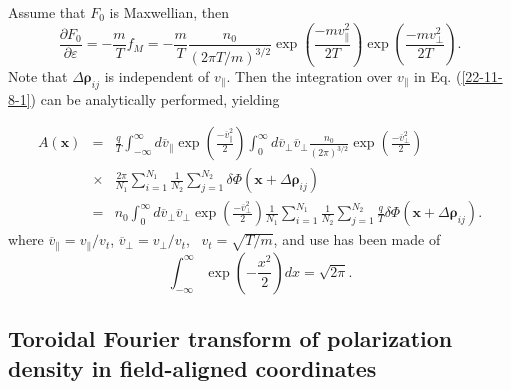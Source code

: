 \documentclass{article}
\begin{document}
Assume that $F_0$ is Maxwellian, then
\begin{equation}
  \frac{\partial F_0}{\partial \varepsilon} = - \frac{m}{T} f_M = -
  \frac{m}{T} \frac{n_0}{(2 \pi T / m)^{3 / 2}} \exp \left( \frac{- m
  v^2_{\parallel}}{2 T} \right) \exp \left( \frac{- m v^2_{\perp}}{2 T}
  \right) .
\end{equation}
Note that $\Delta \mathbf{\rho}_{i j}$ is independent of $v_{\parallel}$. Then
the integration over $v_{\parallel}$ in Eq. (\ref{22-11-8-1}) can be
analytically performed, yielding


\begin{eqnarray}
  A (\mathbf{x}) & = & \frac{q}{T}  \int_{- \infty}^{\infty} d
  \overline{v}_{\parallel} \exp \left( \frac{- \overline{v}^2_{\parallel}}{2}
  \right) \int_0^{\infty} d \overline{v}_{\perp} \overline{v}_{\perp}
  \frac{n_0}{(2 \pi)^{3 / 2}} \exp \left( \frac{- \overline{v}^2_{\perp}}{2}
  \right) \nonumber\\
  & \times & \frac{2 \pi}{N_1} \sum_{i = 1}^{N_1} \frac{1}{N_2}  \sum_{j =
  1}^{N_2} \delta \Phi (\mathbf{x} + \Delta \mathbf{\rho}_{i j}) \nonumber\\
  & = & n_0  \int_0^{\infty} d \overline{v}_{\perp} \overline{v}_{\perp} \exp
  \left( \frac{- \overline{v}^2_{\perp}}{2} \right) \frac{1}{N_1} \sum_{i =
  1}^{N_1} \frac{1}{N_2}  \sum_{j = 1}^{N_2} \frac{q}{T} \delta \Phi
  (\mathbf{x} + \Delta \mathbf{\rho}_{i j}) .  \label{21-9-16-a5}
\end{eqnarray}
where $\overline{v}_{\parallel} = v_{\parallel} / v_t$, $\overline{v}_{\perp}
= v_{\perp} / v_t$, \ $v_t = \sqrt{T / m}$, and use has been made of
\begin{equation}
  \int_{- \infty}^{\infty} \exp \left( - \frac{x^2}{2} \right) d x = \sqrt{2
  \pi} .
\end{equation}

\subsection{Toroidal Fourier transform of polarization density in
field-aligned coordinates}
\end{document}
